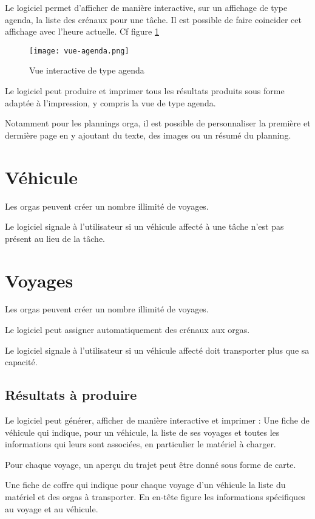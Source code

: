 Le logiciel permet d'afficher de manière interactive, sur un affichage de type agenda, la liste des crénaux pour une tâche. Il est possible de faire coincider cet affichage avec l'heure actuelle.
Cf figure \ref{fig:agenda}

\begin{figure}[h!t]
\centering
\texttt{[image: vue-agenda.png]}

\caption{Vue interactive de type agenda}
\label{fig:agenda}
\end{figure}


Le logiciel peut produire et imprimer tous les résultats produits sous forme adaptée à l'impression, y compris la vue de type agenda.


Notamment pour les plannings orga, il est possible de personnaliser la première et dermière page en y ajoutant du texte, des images ou un résumé du planning.
\section{Véhicule}

Les orgas peuvent créer un nombre illimité de voyages.


Le logiciel signale à l'utilisateur si un véhicule affecté à une tâche n'est pas présent au lieu de la tâche.





\section{Voyages}

Les orgas peuvent créer un nombre illimité de voyages.

Le logiciel peut assigner automatiquement des crénaux aux orgas.

Le logiciel signale à l'utilisateur si un véhicule affecté doit transporter plus que sa capacité.

\subsection{Résultats à produire}
Le logiciel peut générer, afficher de manière interactive et imprimer :
Une fiche de véhicule qui indique, pour un véhicule, la liste de ses voyages et toutes les informations qui leurs sont associées, en particulier le matériel à charger.

Pour chaque voyage, un aperçu du trajet peut être donné sous forme de carte.

Une fiche de coffre qui indique pour chaque voyage d'un véhicule la liste du matériel et des orgas à transporter.
En en-tête figure les informations spécifiques au voyage et au véhicule.

